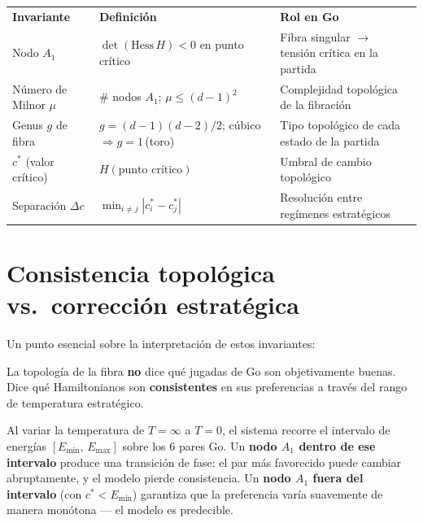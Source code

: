 \documentclass[11pt, a4paper]{article}
\newcommand{\TH}[1]{\cellcolor{cTHbg}\color{white}\textbf{#1}}
\begin{document}
\medskip
\begin{center}
\begin{tabularx}{0.96\textwidth}{L{3cm}L{5.2cm}X}
  \TH{Invariante} & \TH{Definici\'on} & \TH{Rol en Go} \\[1pt]
  Nodo $A_1$
    & $\det(\mathrm{Hess}\,H)<0$ en punto cr\'itico
    & Fibra singular $\to$ tensi\'on cr\'itica en la partida \\
  N\'umero de Milnor $\mu$
    & $\#$ nodos $A_1$;\; $\mu\leq(d-1)^2$
    & Complejidad topol\'ogica de la fibraci\'on \\
  Genus $g$ de fibra
    & $g=(d-1)(d-2)/2$;\; c\'ubico $\Rightarrow g=1$\,(toro)
    & Tipo topol\'ogico de cada estado de la partida \\
  $c^*$ (valor cr\'itico)
    & $H(\text{punto cr\'itico})$
    & Umbral de cambio topol\'ogico \\
  Separaci\'on $\Delta c$
    & $\min_{i\neq j}|c^*_i - c^*_j|$
    & Resoluci\'on entre reg\'imenes estrat\'egicos \\
\end{tabularx}
\end{center}

\section{Consistencia topol\'ogica vs.\ correcci\'on estrat\'egica}

Un punto esencial sobre la interpretaci\'on de estos invariantes:

\begin{tcolorbox}[quotebox]
  La topolog\'ia de la fibra \textbf{no} dice qu\'e jugadas de Go son
  objetivamente buenas. Dice qu\'e Hamiltonianos son \textbf{consistentes}
  en sus preferencias a trav\'es del rango de temperatura estrat\'egico.
\end{tcolorbox}

Al variar la temperatura de $T=\infty$ a $T=0$, el sistema recorre el
intervalo de energ\'ias $[E_{\min},\, E_{\max}]$ sobre los 6 pares Go.
Un \textbf{nodo $A_1$ dentro de ese intervalo} produce una transici\'on de fase:
el par m\'as favorecido puede cambiar abruptamente, y el modelo pierde consistencia.
Un \textbf{nodo $A_1$ fuera del intervalo} (con $c^*<E_{\min}$) garantiza que
la preferencia var\'ia suavemente de manera mon\'otona --- el modelo es predecible.
\end{document}
